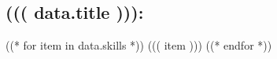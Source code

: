 \subsection{((( data.title ))):}
\sectionsep
((* for item in data.skills *))
((( item )))
((* endfor *))
\sectionsep